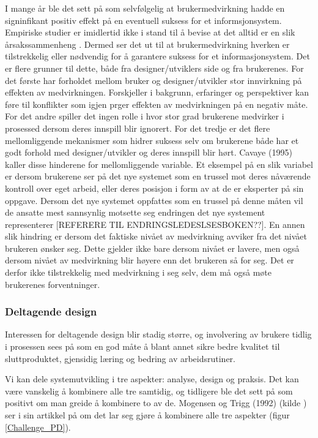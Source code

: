 \noindent
I mange år ble det sett på som selvfølgelig at brukermedvirkning hadde en signinfikant positiv effekt på en eventuell suksess for et informsjonsystem. Empiriske studier er imidlertid ikke i stand til å bevise at det alltid er en slik årsakssammenheng \cite{Cavaye95}. Dermed ser det ut til at brukermedvirkning hverken er tilstrekkelig eller nødvendig for å garantere suksess for et informasjonsystem. Det er flere grunner til dette, både fra designer/utviklers side og fra brukerenes. For det første har forholdet mellom bruker og designer/utvikler stor innvirkning på effekten av medvirkningen. Forskjeller i bakgrunn, erfaringer og perspektiver kan føre til konflikter som igjen prger effekten av medvirkningen på en negativ måte. For det andre spiller det ingen rolle i hvor stor grad brukerene medvirker i prosessed dersom deres innspill blir ignorert. For det tredje er det flere mellomliggende mekanismer som hidrer suksess selv om brukerene både har et godt forhold med designer/utvikler og deres innspill blir hørt. Cavaye (1995) kaller disse hinderene for mellomliggende variable. Et eksempel på en slik variabel er dersom brukerene ser på det nye systemet som en trussel mot deres nåværende kontroll over eget arbeid, eller deres posisjon i form av at de er eksperter på sin oppgave. Dersom det nye systemet oppfattes som en trussel på denne måten vil de ansatte mest sannsynlig motsette seg endringen det nye systement representerer [REFERERE TIL ENDRINGSLEDESLSESBOKEN??]. En annen slik hindring er dersom det faktiske nivået av medvirkning avviker fra det nivået brukeren ønsker seg. Dette gjelder ikke bare dersom nivået er lavere, men også dersom nivået av medvirkning blir høyere enn det brukeren så for seg. Det er derfor ikke tilstrekkelig med medvirkning i seg selv, dem må også møte brukerenes forventninger.

\subsubsection{Deltagende design}
Interessen for deltagende design blir stadig større, og involvering av brukere tidlig i prosessen sees på som en god måte å blant annet sikre bedre kvalitet til sluttproduktet, gjensidig læring og bedring av arbeidsrutiner.

\noindent
Vi kan dele systemutvikling i tre aspekter: analyse, design og praksis. Det kan være vanskelig å kombinere alle tre samtidig, og tidligere ble det sett på som positivt om man greide å kombinere to av de. Mogensen og Trigg (1992) (kilde \cite{Mogensen92}) ser i sin artikkel på om det lar seg gjøre å kombinere alle tre aspekter (figur \ref{Challenge_PD}).

